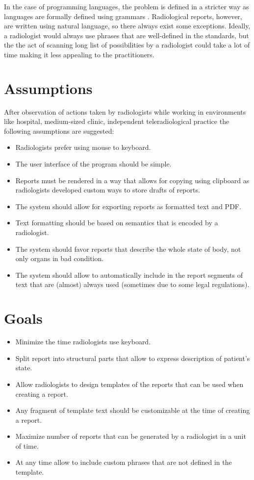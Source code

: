 \documentclass[12pt, twoside, openany]{report}
\theoremstyle{definition}
\begin{document}
In the case of programming languages, the problem is defined in a stricter way as languages are formally defined using grammars \cite{csharp-spec}. Radiological reports, however, are written using natural language, so there always exist some exceptions. Ideally, a radiologist would always use phrases that are well-defined in the standards, but the the act of scanning long list of possibilities by a radiologist could take a lot of time making it less appealing to the practitioners.


\section{Assumptions}
After observation of actions taken by radiologists while working in environments like hospital, medium-sized clinic, independent teleradiological practice the following assumptions are suggested:
\begin{itemize}
	\item Radiologists prefer using mouse to keyboard.
	\item The user interface of the program should be simple.
	\item Reports must be rendered in a way that allows for copying using clipboard as radiologists developed custom ways to store drafts of reports.
	\item The system should allow for exporting reports as formatted text and PDF.
	\item Text formatting should be based on semantics that is encoded by a radiologist.
	\item The system should favor reports that describe the whole state of body, not only organs in bad condition.
	\item The system should allow to automatically include in the report segments of text that are (almost) always used (sometimes due to some legal regulations).
	
\end{itemize}
\section{Goals}
\begin{itemize}
	\item Minimize the time radiologists use keyboard.
	\item Split report into structural parts that allow to express description of patient's state.
	\item Allow radiologists to design templates of the reports that can be used when creating a report.
	\item Any fragment of template text should be customizable at the time of creating a report. 
	\item Maximize number of reports that can be generated by a radiologist in a unit of time.
	\item At any time allow to include custom phrases that are not defined in the template.
\end{itemize}
\end{document}
